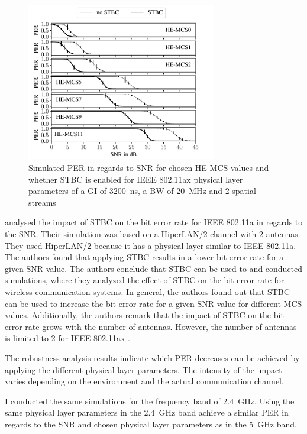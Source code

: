 \begin{figure}%
   \centering
   \includegraphics[width=0.74\textwidth]{figures/STBC_PER_to_SNR.pdf}
   \caption{Simulated \ac{PER} in regards to \ac{SNR} for chosen HE-\ac{MCS} values and whether \ac{STBC} is enabled for IEEE 802.11ax physical layer parameters of a \ac{GI} of \SI{3200}{\nano\second}, a \ac{BW} of \SI{20}{\mega\hertz} and 2 spatial streams}%
   \label{fig:PER_SNR_STBC}%
\end{figure}
\textcite{stamoulis_impact_2003} analysed the impact of \ac{STBC} on the bit error rate for IEEE 802.11a in regards to the \ac{SNR}. Their simulation was based
on a HiperLAN/2 channel with \num{2} antennas. They used HiperLAN/2 because it has a physical layer similar to IEEE 802.11a.
The authors found that applying \ac{STBC} results in a lower bit error rate for a given \ac{SNR} value. The authors conclude that \ac{STBC} can be used to
\textcite{santumon_space-time_2012} and \textcite{tarokh_space-time_1999} conducted simulations, where they analyzed the effect of \ac{STBC} on the bit error rate for
wireless communication systems. In general, the authors found out that \ac{STBC} can be used to increase the bit error rate for a given \ac{SNR} value for different
\ac{MCS} values. Additionally, the authors remark that the impact of \ac{STBC} on the bit error rate grows with the number of antennas.
However, the number of antennas is limited to \num{2} for IEEE 802.11ax \cite{ieee_standard_2021ax}.

The robustness analysis results indicate which \ac{PER} decreases can be achieved by applying the different physical layer parameters.
The intensity of the impact varies depending on the environment and the actual communication channel.

I conducted the same simulations for the frequency band of \SI{2.4}{\giga\hertz}. Using the same physical layer parameters in
the \SI{2.4}{\giga\hertz} band achieve a similar \ac{PER} in regards to the \ac{SNR} and chosen physical layer parameters
as in the \SI{5}{\giga\hertz} band.

